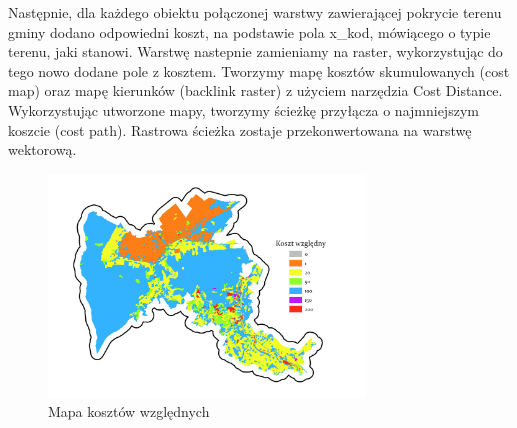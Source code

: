 \documentclass{article}
\begin{document}
Następnie, dla każdego obiektu połączonej warstwy zawierającej pokrycie terenu gminy dodano odpowiedni koszt, na podstawie pola x\_kod, mówiącego o typie terenu, jaki stanowi. Warstwę nastepnie zamieniamy na raster, wykorzystując do tego nowo dodane pole z kosztem. Tworzymy mapę kosztów skumulowanych (cost map) oraz mapę kierunków (backlink raster) z użyciem narzędzia Cost Distance. Wykorzystując utworzone mapy, tworzymy ścieżkę przyłącza o najmniejszym koszcie (cost path). Rastrowa ścieżka zostaje przekonwertowana na warstwę wektorową.

\begin{figure}[H]
    \centering
    \includegraphics[width=0.75\textwidth]{img/cost-raster.jpg}
    \caption*{Mapa kosztów względnych}
\end{figure}
\end{document}
